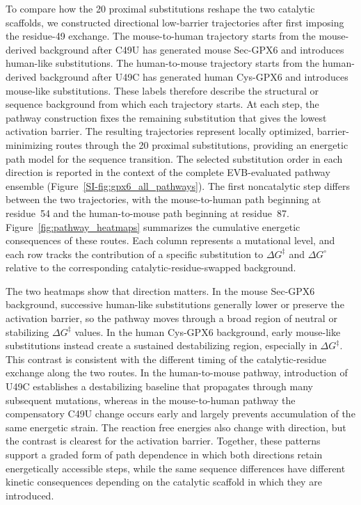To compare how the 20 proximal substitutions reshape the two catalytic scaffolds, we constructed directional low-barrier trajectories after first imposing the residue-49 exchange. The mouse-to-human trajectory starts from the mouse-derived background after C49U has generated mouse Sec-GPX6 and introduces human-like substitutions. The human-to-mouse trajectory starts from the human-derived background after U49C has generated human Cys-GPX6 and introduces mouse-like substitutions. These labels therefore describe the structural or sequence background from which each trajectory starts. At each step, the pathway construction fixes the remaining substitution that gives the lowest activation barrier. The resulting trajectories represent locally optimized, barrier-minimizing routes through the 20 proximal substitutions, providing an energetic path model for the sequence transition. The selected substitution order in each direction is reported in the context of the complete EVB-evaluated pathway ensemble (Figure~\ref{SI-fig:gpx6_all_pathways}). The first noncatalytic step differs between the two trajectories, with the mouse-to-human path beginning at residue~54 and the human-to-mouse path beginning at residue~87. Figure~\ref{fig:pathway_heatmaps} summarizes the cumulative energetic consequences of these routes. Each column represents a mutational level, and each row tracks the contribution of a specific substitution to $\Delta G^{\ddagger}$ and $\Delta G^{\circ}$ relative to the corresponding catalytic-residue-swapped background.

The two heatmaps show that direction matters. In the mouse Sec-GPX6 background, successive human-like substitutions generally lower or preserve the activation barrier, so the pathway moves through a broad region of neutral or stabilizing $\Delta G^{\ddagger}$ values. In the human Cys-GPX6 background, early mouse-like substitutions instead create a sustained destabilizing region, especially in $\Delta G^{\ddagger}$. This contrast is consistent with the different timing of the catalytic-residue exchange along the two routes. In the human-to-mouse pathway, introduction of U49C establishes a destabilizing baseline that propagates through many subsequent mutations, whereas in the mouse-to-human pathway the compensatory C49U change occurs early and largely prevents accumulation of the same energetic strain. The reaction free energies also change with direction, but the contrast is clearest for the activation barrier. Together, these patterns support a graded form of path dependence in which both directions retain energetically accessible steps, while the same sequence differences have different kinetic consequences depending on the catalytic scaffold in which they are introduced.

